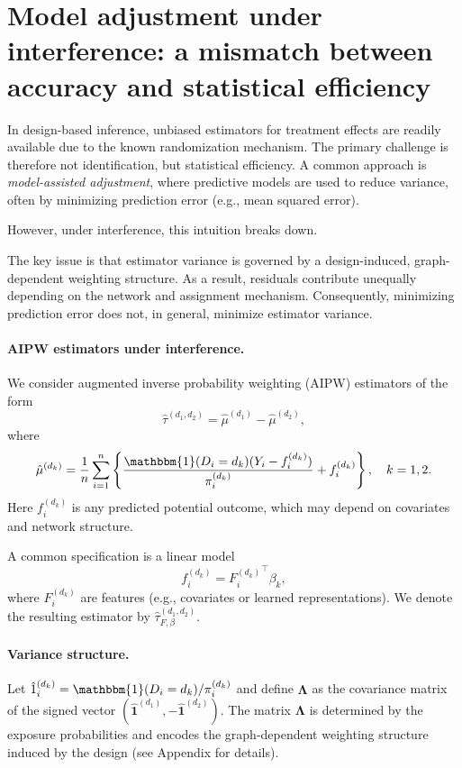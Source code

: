 \documentclass{article}
\theoremstyle{plain}
\theoremstyle{definition}
\theoremstyle{remark}
\newcommand{\bLambda}{\boldsymbol{\Lambda}}
\newcommand{\indicator}{\mathbbm{1}}
\newcommand{\bOne}{\boldsymbol{1}}
\begin{document}

\section{Model adjustment under interference: a mismatch between accuracy and statistical efficiency}
\label{sec::model_assisted_adjustment} 

In design-based inference, unbiased estimators for treatment effects are readily available due to the known randomization mechanism. The primary challenge is therefore not identification, but statistical efficiency. A common approach is \emph{model-assisted adjustment}, where predictive models are used to reduce variance, often by minimizing prediction error (e.g., mean squared error).

However, under interference, this intuition breaks down.

The key issue is that estimator variance is governed by a design-induced, graph-dependent weighting structure. As a result, residuals contribute unequally depending on the network and assignment mechanism. Consequently, minimizing prediction error does not, in general, minimize estimator variance.

\paragraph{AIPW estimators under interference.}
We consider augmented inverse probability weighting (AIPW) estimators of the form
\[
\hat\tau^{(d_1,d_2)} = \hat{\mu}^{(d_1)} - \hat{\mu}^{(d_2)},
\]
where
\begin{align}
    \hat{\mu}^{(d_k)} = \frac{1}{n}\sum_{i=1}^n \left\{ \frac{\indicator(D_i=d_k)(Y_i-f_i^{(d_k)})}{\pi_i^{(d_k)}} + f_i^{(d_k)} \right\}, \quad k=1,2.
\end{align}
Here $f_i^{(d_k)}$ is any predicted potential outcome, which may depend on covariates and network structure.

A common specification is a linear model
\[
f_i^{(d_k)} = {F_i^{(d_k)}}^\top \beta_k,
\]
where $F_i^{(d_k)}$ are features (e.g., covariates or learned representations). We denote the resulting estimator by $\hat\tau^{(d_1,d_2)}_{F,\beta}$.

\paragraph{Variance structure.}
Let $\hat{1}_i^{(d_k)} = \indicator(D_i=d_k)/\pi_i^{(d_k)}$ and define $\bLambda$ as the covariance matrix of the signed vector $(\hat{\bOne}^{(d_1)}, -\hat{\bOne}^{(d_2)})$. The matrix $\bLambda$ is determined by the exposure probabilities and encodes the graph-dependent weighting structure induced by the design (see Appendix for details).
\end{document}
